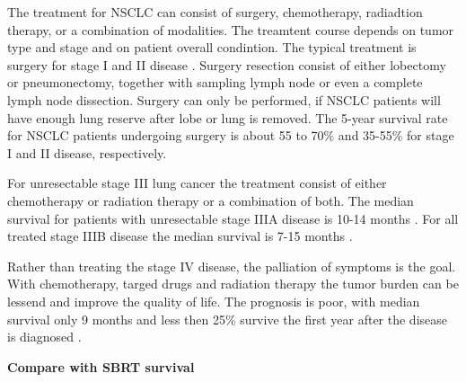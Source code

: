 \documentclass[type=dr, dr=rernat, accentcolor=tud7b,colorbacktitle, bigchapter, openright, twoside, 12pt ]{tudthesis}
\begin{document}
The treatment for NSCLC can consist of surgery, chemotherapy, radiadtion therapy, or a combination of modalities. The treamtent course depends on tumor type and stage and on patient overall condintion.
The typical treatment is surgery for stage I and II disease \cite{Tsao2008}. Surgery resection consist of either lobectomy or pneumonectomy, together with sampling lymph node or even a complete lymph node
dissection. Surgery can only be performed, if NSCLC patients will have enough lung reserve after lobe or lung is removed. The 5-year survival rate for NSCLC patients undergoing surgery is about 55 to 70\% 
and 35-55\% for stage I and II disease, respectively.

For unresectable stage III lung cancer the treatment consist of either chemotherapy or radiation therapy or a combination of both. The median survival for patients with unresectable stage IIIA disease is 10-14 months \cite{Tsao2008}.
For all treated stage IIIB disease the median survival is 7-15 months \cite{Srisam2005}.

Rather than treating the stage IV disease, the palliation of symptoms is the goal. With chemotherapy, targed drugs and radiation therapy the tumor burden can be lessend and improve the quality of life. The prognosis is poor, with
median survival only 9 months and less then 25\% survive the first year after the disease is diagnosed \cite{Tsao2008}.

\textbf{Compare with SBRT survival}



{}
% 
\end{document}
